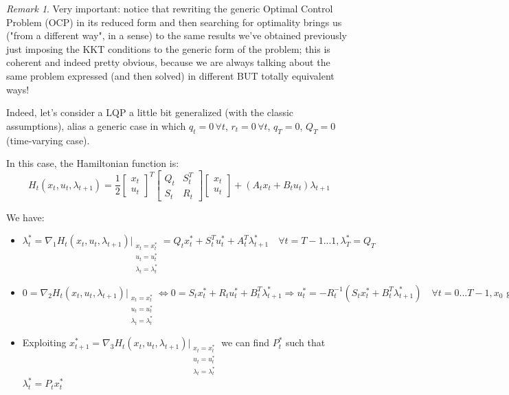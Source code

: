 \documentclass[openany]{book}
\theoremstyle{definition}
\theoremstyle{remark}
\newtheorem*{remark}{Remark}
\begin{document}
\begin{remark}
Very important: notice that rewriting the generic Optimal Control Problem (OCP) in its reduced form and then searching for optimality brings us ("from a different way", in a sense) to the same results we've obtained previously just imposing the KKT conditions to the generic form of the problem; this is coherent and indeed pretty obvious, because we are always talking about the same problem expressed (and then solved) in different BUT totally equivalent ways!
\end{remark}

Indeed, let's consider a LQP a little bit generalized (with the classic assumptions), alias a generic case in which $q_t = 0 \, \forall t$, $r_t = 0 \, \forall t$, $q_T = 0$, $Q_T = 0$ (time-varying case).

In this case, the Hamiltonian function is:
\[
H_t(x_t, u_t, \lambda_{t+1}) = \frac{1}{2}\begin{bmatrix}
x_t \\ u_t
\end{bmatrix}^T \begin{bmatrix}
Q_t & S_t^T \\ S_t & R_t
\end{bmatrix}\begin{bmatrix}
x_t \\ u_t
\end{bmatrix} + (A_tx_t + B_tu_t)\lambda_{t+1}
\]

We have:

\begin{itemize}
    \item $\lambda_t^* = \nabla_1 H_t(x_t, u_t, \lambda_{t+1})\big|_{\substack{x_t=x_t^*\\ u_t=u_t^*\\ \lambda_t=\lambda_t^*}} = Q_tx_t^* + S_t^Tu_t^* + A_t^T\lambda_{t+1}^* \quad \forall t=T-1...1, \lambda_T^* = Q_T$

    \item $0 = \nabla_2 H_t(x_t, u_t, \lambda_{t+1})\big|_{\substack{x_t=x_t^*\\ u_t=u_t^*\\ \lambda_t=\lambda_t^*}} \Leftrightarrow 0 = S_tx_t^* + R_tu_t^* + B_t^T\lambda_{t+1}^* \Rightarrow u_t^* = -R_t^{-1}(S_tx_t^* + B_t^T\lambda_{t+1}^*) \quad \forall t=0...T-1, x_0 \text{ given}$

    \item Exploiting $x_{t+1}^* = \nabla_3 H_t(x_t, u_t, \lambda_{t+1})\big|_{\substack{x_t=x_t^*\\ u_t=u_t^*\\ \lambda_t=\lambda_t^*}}$ we can find $P_t^*$ such that $\lambda_t^* = P_tx_t^*$
\end{itemize}
\end{document}
